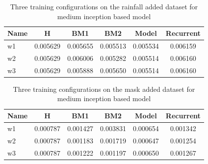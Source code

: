 \begin{table}[htbp]
	\centering
	\caption{Three training configurations on the rainfall added dataset for medium inception based model}
	\label{tab:medium_rf}
	\begin{tabular}{p{2cm}ccccc}
		\toprule
		Name &  H &  BM1 &  BM2 &  Model &  Recurrent \\
		\midrule
		w1 &       0.005629 &        0.005655 &        0.005513 &   0.005534 &            0.006159 \\
		w2 &       0.005629 &        0.006006 &        0.005282 &   0.005514 &            0.006160 \\
		w3 &       0.005629 &        0.005888 &        0.005650 &   0.005514 &            0.006160 \\
		\bottomrule
	\end{tabular}
\end{table}

\begin{table}[htbp]
	\centering
	\caption{Three training configurations on the mask added dataset for medium inception based model}
	\label{tab:medium_mask}
	\begin{tabular}{p{2cm}ccccc}
		\toprule
		Name &  H &  BM1 &  BM2 &  Model &  Recurrent \\
		\midrule
		w1 &       0.000787 &        0.001427 &        0.003831 &   0.000654 &            0.001342 \\
		w2 &       0.000787 &        0.001183 &        0.001719 &   0.000647 &            0.001254 \\
		w3 &       0.000787 &        0.001222 &        0.001197 &   0.000650 &            0.001267 \\
		\bottomrule
	\end{tabular}
\end{table}

